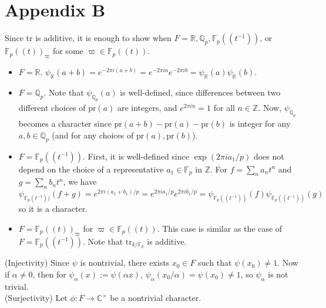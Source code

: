 \newpage
\section{Appendix B}

\begin{problem}
Since $\mathrm{tr}$ is additive, it is enough to show when $F = \mathbb{R}, \mathbb{Q}_p, \mathbb{F}_p((t^{-1}))$, or $\mathbb{F}_p((t))_\varpi$
for some $\varpi \in \mathbb{F}_p((t))$.
\begin{itemize}
    \item $F =\mathbb{R}$. $\psi_\mathbb{R}(a+b) = e^{-2\pi i (a+b)} = e^{-2\pi i a}e^{-2\pi i b} = \psi_\mathbb{R}(a)\psi_\mathbb{R}(b)$.
    \item $F = \mathbb{Q}_p$. Note that $\psi_{\mathbb{Q}_p}(a)$ is well-defined, since differences between two different choices of $\mathrm{pr}(a)$ are integers, 
    and $e^{2\pi i n} = 1$ for all $n\in\mathbb{Z}$.
    Now, $\psi_{\mathbb{Q}_p}$ becomes a character since $\mathrm{pr}(a+b) - \mathrm{pr}(a) -\mathrm{pr}(b)$ is integer for any $a, b\in\mathbb{Q}_p$
    (and for any choices of $\mathrm{pr}(a), \mathrm{pr}(b)$).
    \item $F = \mathbb{F}_p((t^{-1}))$.
    First, it is well-defined since $\exp(2\pi i a_1 / p)$ does not depend on the choice of a representative $a_1 \in \mathbb{F}_p$ in $\mathbb{Z}$.
    For $f = \sum_{n} a_n t^n$ and $g = \sum_n b_n t^n$, we have
    $$
        \psi_{\mathbb{F}_p(t^{-1}))}\left(f + g\right)  = e^{2\pi i (a_1 + b_1)/p} = e^{2\pi i a_1 / p} e^{2\pi i b_1 / p} = \psi_{\mathbb{F}_p((t^{-1}))}(f) \psi_{\mathbb{F}_p((t^{-1}))}(g)
    $$
    so it is a character.
    \item $F = \mathbb{F}_p((t))_\varpi$ for $\varpi \in \mathbb{F}_p((t))$.
    This case is similar as the case of $F = \mathbb{F}_p((t^{-1}))$. Note that $\mathrm{tr}_{k/\mathbb{F}_p}$ is additive.

\end{itemize}
\end{problem}

\begin{problem} \notfinish
(Injectivity) Since $\psi$ is nontrivial, there exists $x_0 \in F$ such that $\psi(x_0) \neq 1$.
Now if $\alpha \neq 0$, then for $\psi_\alpha(x):=\psi(\alpha x)$, $\psi_{\alpha}(x_0 / \alpha) = \psi(x_0) \neq 1$, so $\psi_\alpha$ is not trivial. \\
(Surjectivity) Let $\phi: F \to \mathbb{C}^\times$ be a nontrivial character.
\end{problem}

